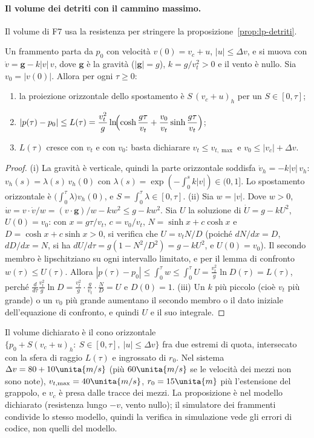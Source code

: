 \paragraph{Il volume dei detriti con il cammino massimo.} Il volume di F7 usa la resistenza per stringere la proposizione~\ref{prop:lp-detriti}.

\begin{proposizione}\label{prop:vo-cammino}
Un frammento parta da $p_0$ con velocità $v(0)=v_c+u$, $|u|\le\Delta v$, e si muova con $\dot v=\mathbf g-k|v|\,v$, dove $\mathbf g$ è la gravità ($|\mathbf g|=g$), $k=g/v_t^2>0$ e il vento è nullo. Sia $v_0=|v(0)|$. Allora per ogni $\tau\ge0$:
\begin{enumerate}[label=(\roman*)]
\item la proiezione orizzontale dello spostamento è $S\,(v_c+u)_h$ per un $S\in[0,\tau]$;
\item $|p(\tau)-p_0|\le L(\tau)=\dfrac{v_t^2}{g}\ln\!\Bigl(\cosh\dfrac{g\tau}{v_t}+\dfrac{v_0}{v_t}\sinh\dfrac{g\tau}{v_t}\Bigr)$;
\item $L(\tau)$ cresce con $v_t$ e con $v_0$: basta dichiarare $v_t\le v_{t,\max}$ e $v_0\le|v_c|+\Delta v$.
\end{enumerate}
\end{proposizione}
\begin{proof}
(i) La gravità è verticale, quindi la parte orizzontale soddisfa $\dot v_h=-k|v|\,v_h$: $v_h(s)=\lambda(s)\,v_h(0)$ con $\lambda(s)=\exp(-\int_0^sk|v|)\in(0,1]$. Lo spostamento orizzontale è $\bigl(\int_0^\tau\lambda\bigr)v_h(0)$, e $S=\int_0^\tau\lambda\in[0,\tau]$.
(ii) Sia $w=|v|$. Dove $w>0$, $\dot w=v\cdot\dot v/w=(v\cdot\mathbf g)/w-kw^2\le g-kw^2$. Sia $U$ la soluzione di $\dot U=g-kU^2$, $U(0)=v_0$: con $x=g\tau/v_t$, $c=v_0/v_t$, $N=\sinh x+c\cosh x$ e $D=\cosh x+c\sinh x>0$, si verifica che $U=v_tN/D$ (poiché $dN/dx=D$, $dD/dx=N$, si ha $dU/d\tau=g(1-N^2/D^2)=g-kU^2$, e $U(0)=v_0$). Il secondo membro è lipschitziano su ogni intervallo limitato, e per il lemma di confronto $w(\tau)\le U(\tau)$. Allora $|p(\tau)-p_0|\le\int_0^\tau w\le\int_0^\tau U=\frac{v_t^2}{g}\ln D(\tau)=L(\tau)$, perché $\frac{d}{d\tau}\frac{v_t^2}{g}\ln D=\frac{v_t^2}{g}\cdot\frac{g}{v_t}\cdot\frac ND=U$ e $D(0)=1$.
(iii) Un $k$ più piccolo (cioè $v_t$ più grande) o un $v_0$ più grande aumentano il secondo membro o il dato iniziale dell'equazione di confronto, e quindi $U$ e il suo integrale.
\end{proof}
Il volume dichiarato è il cono orizzontale $\{p_0+S(v_c+u)_h:\ S\in[0,\tau],\ |u|\le\Delta v\}$ fra due estremi di quota, intersecato con la sfera di raggio $L(\tau)$ e ingrossato di $r_0$. Nel sistema $\Delta v=80+10\unita{m/s}$ (più $60\unita{m/s}$ se le velocità dei mezzi non sono note), $v_{t,\max}=40\unita{m/s}$, $r_0=15\unita{m}$ più l'estensione del grappolo, e $v_c$ è presa dalle tracce dei mezzi. La proposizione è  nel modello dichiarato (resistenza lungo $-v$, vento nullo); il simulatore dei frammenti condivide lo stesso modello, quindi la verifica in simulazione vede gli errori di codice, non quelli del modello.

